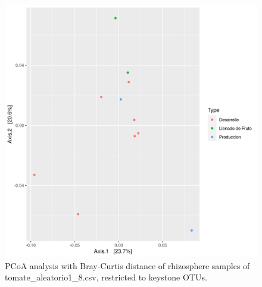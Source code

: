 \begin{figure}
  \centering
  \includegraphics[scale = 0.7]{pcoa_key_otus_tomate_aleatorio1_8.csv.png}
  \caption{PCoA analysis with Bray-Curtis distance of rhizosphere samples of tomate_aleatorio1_8.csv, restricted to keystone OTUs.}
  \label{fig:tomate_aleatorio1_8.csv_pcoa_key_otus}
\end{figure}
